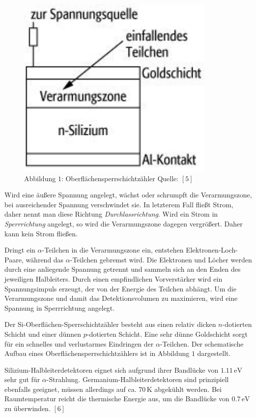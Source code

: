 \documentclass[12pt,a4paper]{scrartcl}
\numberwithin{equation}{section} %
\renewcommand{\[}{} %
\renewcommand{\]}{\noindent} %
\begin{document}
\begin{figure}
\centering
\includegraphics{../media/B3.3/Oberflaechensperrschichtzaehler.pdf}
\caption{Abbildung \(1\): Oberflächensperrschichtzähler Quelle: \([5]\)}
\end{figure}

Wird eine äußere Spannung angelegt, wächst oder schrumpft die
Verarmungszone, bei ausreichender Spannung verschwindet sie. In
letzterem Fall fließt Strom, daher nennt man diese Richtung
\emph{Durchlassrichtung}. Wird ein Strom in \emph{Sperrrichtung}
angelegt, so wird die Verarmungszone dagegen vergrößert. Daher kann kein
Strom fließen.

Dringt ein \(\alpha\)-Teilchen in die Verarmungszone ein, entstehen
Elektronen-Loch-Paare, während das \(\alpha\)-Teilchen gebremst wird.
Die Elektronen und Löcher werden durch eine anliegende Spannung getrennt
und sammeln sich an den Enden des jeweiligen Halbleiters. Durch einen
empfindlichen Vorverstärker wird ein Spannungsimpuls erzeugt, der von
der Energie des Teilchen abhängt. Um die Verarmungszone und damit das
Detektionsvolumen zu maximieren, wird eine Spannung in Sperrrichtung
angelegt.

Der \(\mathrm{Si}\)-Oberflächen-Sperrschichtzähler besteht aus einen
relativ dicken \(n\)-dotierten Schicht und einer dünnen \(p\)-dotierten
Schicht. Eine sehr dünne Goldschicht sorgt für ein schnelles und
verlustarmes Eindringen der \(\alpha\)-Teilchen. Der schematische Aufbau
eines Oberflächensperrschichtzählers ist in Abbildung \(1\) dargestellt.

Silizium-Halbleiterdetektoren eignet sich aufgrund ihrer Bandlücke von
\(1.11\mathrm{\,eV}\) sehr gut für \(\alpha\)-Strahlung.
Germanium-Halbleiterdetektoren sind prinzipiell ebenfalls geeignet,
müssen allerdings auf ca. \(70\,\mathrm K\) abgekühlt werden. Bei
Raumtemperatur reicht die thermische Energie aus, um die Bandlücke von
\(0.7\mathrm{\,eV}\) zu überwinden. \([6]\)
\end{document}
